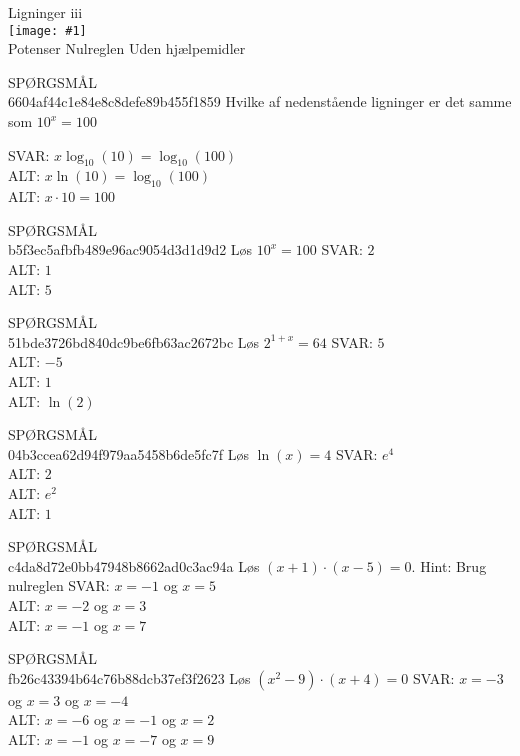 \documentclass[]{article}
\newcounter{spgcounter}
\newenvironment{question}[2]{\addtocounter{spgcounter}{1} SPØRGSMÅL \thespgcounter\\}{\hspace{50px}}
\newcommand{\name}[1]{{\huge #1}\\}
\newcommand{\tag}[1]{#1}
\newcommand{\cover}[1]{\texttt{[image: \#1]}\\}
\newcommand{\answer}[1]{{\color{green} SVAR: #1}\\}
\newcommand{\alt}[1]{{\color{red} ALT: #1}\\}
\begin{document}
\name{Ligninger iii}
\cover{eksponotielligninger.png}
\tag{Potenser}
\tag{Nulreglen}
\tag{Uden hjælpemidler}

\begin{question}{multi}\id{6604af44c1e84e8c8defe89b455f1859}
    Hvilke af nedenstående ligninger er det samme som $10^x = 100$
    
    \answer{$x \log_{10}{(10)} = \log_{10}{(100)}$}
    \alt{$x \ln{(10)} = \log_{10}{(100)}$}
    \alt{$x \cdot 10 = 100$}
    \end{question}
    
    \begin{question}{multi}\id{b5f3ec5afbfb489e96ac9054d3d1d9d2}
    Løs $10^x = 100$
    \answer{$2$}
    \alt{$1$}
    \alt{$5$}
    \end{question}
    
    \begin{question}{multi}\id{51bde3726bd840dc9be6fb63ac2672bc}
    Løs $2^{1+x} = 64$
    \answer{$5$}
    \alt{$-5$}
    \alt{$1$}
    \alt{$\ln{(2)}$}
    \end{question}
    
    \begin{question}{multi}\id{04b3ccea62d94f979aa5458b6de5fc7f}
    Løs $\ln{(x)}=4$
    \answer{$e^4$}
    \alt{$2$}
    \alt{$e^2$}
    \alt{$1$}
    \end{question}
    
    \begin{question}{multi}\id{c4da8d72e0bb47948b8662ad0c3ac94a}
    Løs $(x+1)\cdot (x-5)=0$. Hint: Brug nulreglen
    \answer{$x=-1$ og $x=5$}
    \alt{$x=-2$ og $x=3$}
    \alt{$x=-1$ og $x=7$}
    \end{question}
    
    \begin{question}{multi}\id{fb26c43394b64c76b88dcb37ef3f2623}
    Løs $(x^2-9)\cdot (x+4)=0$
    \answer{$x=-3$ og $x=3$ og $x=-4$}
    \alt{$x=-6$ og $x=-1$ og $x=2$}
    \alt{$x=-1$ og $x=-7$ og $x=9$}
    \end{question}
    
\end{document}
